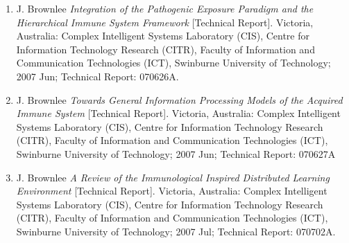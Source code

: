 \begin{enumerate}
	\item J. Brownlee \emph{Integration of the Pathogenic Exposure Paradigm and the Hierarchical Immune System Framework} [Technical Report]. Victoria, Australia: Complex Intelligent Systems Laboratory (CIS), Centre for Information Technology Research (CITR), Faculty of Information and Communication Technologies (ICT), Swinburne University of Technology; 2007 Jun; Technical Report: 070626A.
	\item J. Brownlee \emph{Towards General Information Processing Models of the Acquired Immune System} [Technical Report]. Victoria, Australia: Complex Intelligent Systems Laboratory (CIS), Centre for Information Technology Research (CITR), Faculty of Information and Communication Technologies (ICT), Swinburne University of Technology; 2007 Jun; Technical Report: 070627A
	\item J. Brownlee \emph{A Review of the Immunological Inspired Distributed Learning Environment} [Technical Report]. Victoria, Australia: Complex Intelligent Systems Laboratory (CIS), Centre for Information Technology Research (CITR), Faculty of Information and Communication Technologies (ICT), Swinburne University of Technology; 2007 Jul; Technical Report: 070702A.
	

\end{enumerate}
